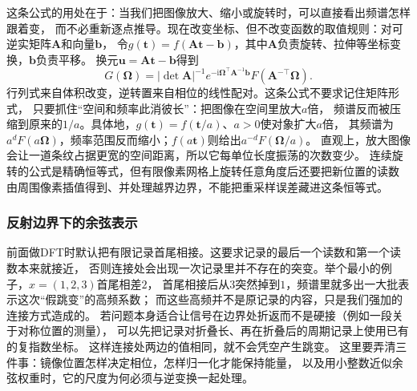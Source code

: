 这条公式的用处在于：当我们把图像放大、缩小或旋转时，可以直接看出频谱怎样跟着变，
而不必重新逐点推导。现在改变坐标、但不改变函数的取值规则：对可逆实矩阵$\bm A$和向量$\bm b$，
令$g(\bm t)=f(\bm A\bm t-\bm b)$，其中$\bm A$负责旋转、拉伸等坐标变换，$\bm b$负责平移。
换元$\bm u=\bm A\bm t-\bm b$得到
\begin{equation}
 G(\bm\Omega)=|\det\bm A|^{-1}
 e^{-\mathrm i\bm\Omega^\top\bm A^{-1}\bm b}
 F(\bm A^{-\top}\bm\Omega).
 \label{eq:signal-fourier-coordinate-change}
\end{equation}
行列式来自体积改变，逆转置来自相位的线性配对。这条公式不要求记住矩阵形式，
只要抓住“空间和频率此消彼长”：把图像在空间里放大$a$倍，
频谱反而被压缩到原来的$1/a$。具体地，$g(\bm t)=f(\bm t/a)$、$a>0$使对象扩大$a$倍，
其频谱为$a^dF(a\bm\Omega)$，频率范围反而缩小；$f(a\bm t)$则给出$a^{-d}F(\bm\Omega/a)$。
直观上，放大图像会让一道条纹占据更宽的空间距离，所以它每单位长度振荡的次数变少。
连续旋转的公式是精确恒等式，但有限像素网格上旋转任意角度后还要把新位置的读数
由周围像素插值得到、并处理越界边界，不能把重采样误差藏进这条恒等式。

\subsubsection{反射边界下的余弦表示}
\label{sec:signal-cosine-representation}

前面做DFT时默认把有限记录首尾相接。这要求记录的最后一个读数和第一个读数本来就接近，
否则连接处会出现一次记录里并不存在的突变。举个最小的例子，$x=(1,2,3)$首尾相差$2$，
首尾相接后从$3$突然掉到$1$，频谱里就多出一大批表示这次“假跳变”的高频系数；
而这些高频并不是原记录的内容，只是我们强加的连接方式造成的。
若问题本身适合让信号在边界处折返而不是硬接（例如一段关于对称位置的测量），
可以先把记录对折叠长、再在折叠后的周期记录上使用已有的复指数坐标。
这样连接处两边的值相同，就不会凭空产生跳变。
这里要弄清三件事：镜像位置怎样决定相位，怎样归一化才能保持能量，
以及用小整数近似余弦权重时，它的尺度为何必须与逆变换一起处理。

